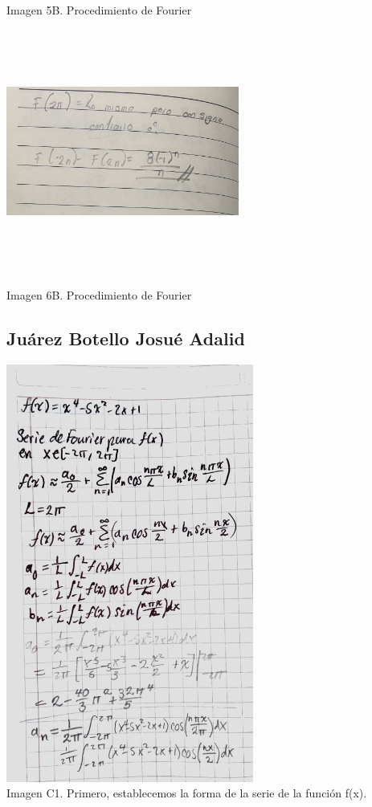 Imagen 5B. Procedimiento de Fourier

\includegraphics[width=3.00684in,height=3.1593in]{media/image46.jpg}

Imagen 6B. Procedimiento de Fourier

\subsection{Juárez Botello Josué Adalid}

\includegraphics[width=3.19696in,height=5.41146in]{media/image44.jpg}\\ Imagen C1. Primero, establecemos la forma de la serie de la función f(x).

